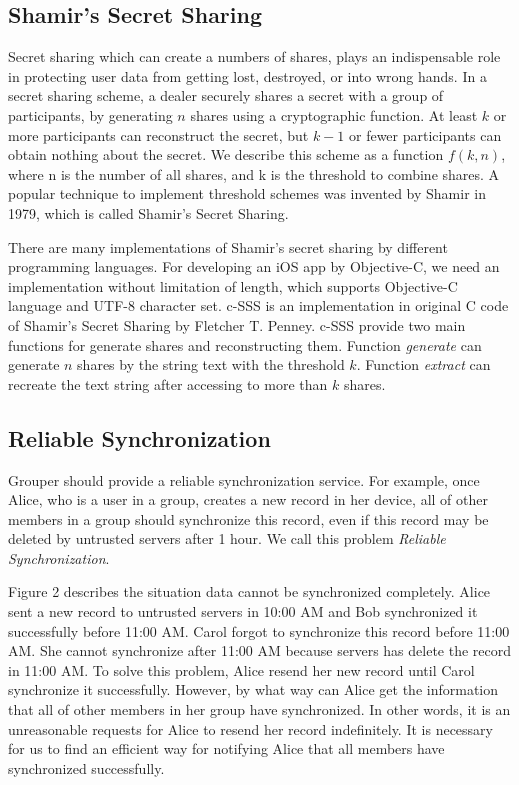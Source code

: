 \documentclass[twocolumn,10pt]{article}
\begin{document}
\subsection{Shamir's Secret Sharing}
Secret sharing which can create a numbers of shares, plays an indispensable role in protecting user data from getting lost, destroyed, or into wrong hands. In a secret sharing scheme, a dealer securely shares a secret with a group of participants, by generating $n$ shares using a cryptographic function\cite{smith2013layered}. At least $k$ or more participants can reconstruct the secret, but $k-1$ or fewer participants can obtain nothing about the secret\cite{pang2005new}. We describe this scheme as a function $f(k, n)$, where n is the number of all shares, and k is the threshold to combine shares. A popular technique to implement threshold schemes was invented by Shamir in 1979, which is called Shamir's Secret Sharing.

There are many implementations of Shamir's secret sharing by different programming languages. For developing an iOS app by Objective-C, we need an implementation without limitation of length, which supports Objective-C language and UTF-8 character set. c-SSS\cite{c-sss} is an implementation in original C code of Shamir's Secret Sharing by Fletcher T. Penney. c-SSS provide two main functions for generate shares and reconstructing them. Function \emph{generate} can generate $n$ shares by the string text with the threshold $k$. Function \emph{extract} can recreate the text string after accessing to more than $k$ shares.

\subsection{Reliable Synchronization}
Grouper should provide a reliable synchronization service. For example, once Alice, who is a user in a group, creates a new record in her device, all of other members in a group should synchronize this record, even if this record may be deleted by untrusted servers after 1 hour. We call this problem \emph{Reliable Synchronization}.

Figure 2 describes the situation data cannot be synchronized completely. Alice sent a new record to untrusted servers in 10:00 AM and Bob synchronized it successfully before 11:00 AM. Carol forgot to synchronize this record before 11:00 AM. She cannot synchronize after 11:00 AM because servers has delete the record in 11:00 AM. To solve this problem, Alice resend her new record until Carol synchronize it successfully. However, by what way can Alice get the information that all of other members in her group have synchronized. In other words, it is an unreasonable requests for Alice to resend her record indefinitely. It is necessary for us to find an efficient way for notifying Alice that all members have synchronized successfully.
\end{document}
